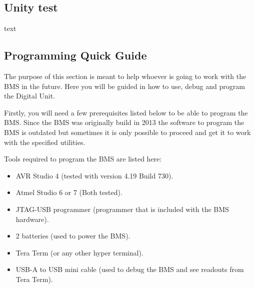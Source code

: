 \subsection{Unity test}
text

\subsection{Programming Quick Guide}
The purpose of this section is meant to help whoever is going to work with the BMS in the future. Here you will be guided in how to use, debug and program the Digital Unit.

Firstly, you will need a few prerequisites listed below to be able to program the BMS. Since the BMS was originally build in 2013 the software to program the BMS is outdated but sometimes it is only possible to proceed and get it to work with the specified utilities. 

Tools required to program the BMS are listed here:
	\begin{itemize}
		\item AVR Studio 4 (tested with version 4.19 Build 730).
		\item Atmel Studio 6 or 7 (Both tested).
		\item JTAG-USB programmer (programmer that is included with the BMS hardware).
		\item 2 batteries (used to power the BMS).
		\item Tera Term (or any other hyper terminal).
		\item USB-A to USB mini cable (used to debug the BMS and see readouts from Tera Term).
	\end{itemize}
	
